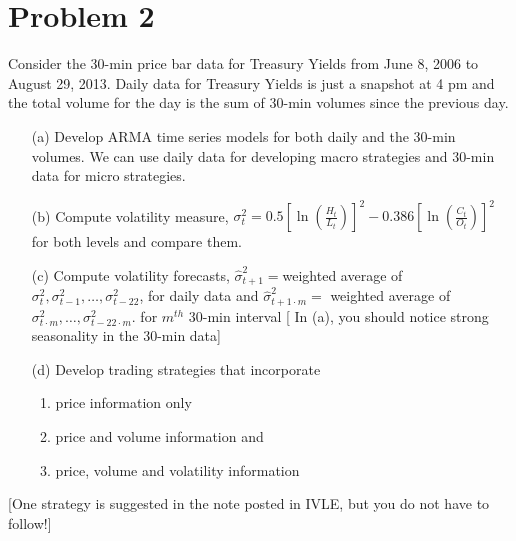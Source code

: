 \documentclass[11pt]{article}
\begin{document}
\section{Problem 2}
Consider the 30-min price bar data for Treasury Yields from June 8, 2006 to August 29, 2013. Daily data for Treasury Yields is just a snapshot at 4 pm and the total volume for the day is the sum of 30-min volumes since the previous day.
\begin{enumerate}
\item[(a)] Develop ARMA time series models for both daily and the 30-min volumes. We can use daily data for developing macro strategies and 30-min data for micro strategies.
\item[(b)] Compute volatility measure, $\sigma^2_t=0.5[\ln(\frac{H_t}{L_t})]^2-0.386[\ln(\frac{C_t}{O_t})]^2$ for both levels and compare them.
\item[(c)] Compute volatility forecasts, $\hat{\sigma}^2_{t+1}=$weighted average of $\sigma^2_t, \sigma^2_{t-1}, \ldots, \sigma^2_{t-22}$, for daily data and $\hat{\sigma}^2_{t+1\cdot m}=$ weighted average of $\sigma^2_{t\cdot m}, \ldots, \sigma^2_{t-22\cdot m}$. for $m^{th}$ 30-min interval [ In (a), you should notice strong seasonality in the 30-min data] 
\item[(d)] Develop trading strategies that incorporate
\begin{enumerate}
\item price information only
\item price and volume information and
\item price, volume and volatility information
\end{enumerate}
\end{enumerate}
[One strategy is suggested in the note posted in IVLE, but you do not have to follow!]
\end{document}
